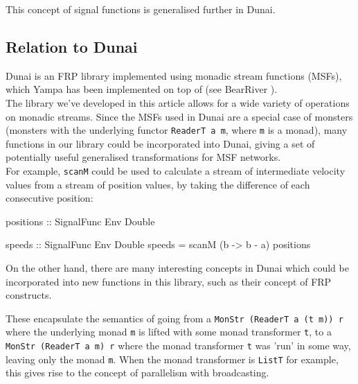 \documentclass{article}
\begin{document}

This concept of signal functions is generalised further in Dunai.

\subsection{Relation to Dunai}

Dunai \cite{frp_refactored}\cite{dunai} is an FRP library implemented using monadic stream functions (MSFs), which Yampa has been implemented on top of (see BearRiver \cite{bearriver}). \\

The library we've developed in this article allows for a wide variety of operations on monadic streams. Since the MSFs used in Dunai are a special case of monsters (monsters with the underlying functor \verb+ReaderT a m+, where \verb+m+ is a monad), many functions in our library could be incorporated into Dunai, giving a set of potentially useful generalised transformations for MSF networks. \\

For example, \verb+scanM+ could be used to calculate a stream of intermediate velocity values from a stream of position values, by taking the difference of each consecutive position:
\begin{haskell}
positions :: SignalFunc Env Double 

speeds :: SignalFunc Env Double 
speeds = scanM (\a b -> b - a) positions
\end{haskell}

On the other hand, there are many interesting concepts in Dunai which could be incorporated into new functions in this library, such as their concept of FRP constructs. 

These encapsulate the semantics of going from a \verb+MonStr (ReaderT a (t m)) r+ where the underlying monad \verb+m+ is lifted with some monad transformer \verb+t+, to a \verb+MonStr (ReaderT a m) r+ where the monad transformer \verb+t+ was 'run' in some way, leaving only the monad \verb+m+. When the monad transformer is \verb+ListT+ for example, this gives rise to the concept of parallelism with broadcasting. \\
\end{document}

